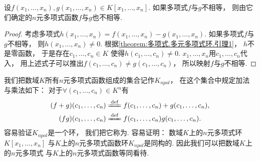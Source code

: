 \begin{theorem}
设\(f(x_1,\dotsc,x_n),g(x_1,\dotsc,x_n) \in K[x_1,\dotsc,x_n]\).
如果多项式\(f\)与\(g\)不相等，
则由它们确定的\(n\)元多项式函数\(f\)与\(g\)也不相等.
\begin{proof}
考虑多项式\(
	h(x_1,\dotsc,x_n)
	=f(x_1,\dotsc,x_n)
	-g(x_1,\dotsc,x_n)
\).
如果多项式\(f\)与\(g\)不相等，
则\(h(x_1,\dotsc,x_n)\neq0\).
根据\cref{theorem:多项式.多元多项式环.引理1}，
\(h\)不是零函数，
于是存在\(c_1,\dotsc,c_n \in K\)
使得\(h(c_1,\dotsc,c_n)\neq0\).
\(x_1,\dotsc,x_n\)用\(c_1,\dotsc,c_n\)代入，
用上述式子可以推出\(f(c_1,\dotsc,c_n) \neq g(c_1,\dotsc,c_n)\)，
所以映射\(f\)与\(g\)不相等.
\end{proof}
\end{theorem}

我们把数域\(K\)所有\(n\)元多项式函数组成的集合记作\(K_{npol}\)，
在这个集合中规定加法与乘法如下：
对于\(\forall(c_1,\dotsc,c_n) \in K^n\)有\begin{gather*}
	(f+g)(c_1,\dotsc,c_n)
	\defeq
	f(c_1,\dotsc,c_n)+g(c_1,\dotsc,c_n), \\
	(fg)(c_1,\dotsc,c_n)
	\defeq
	f(c_1,\dotsc,c_n) g(c_1,\dotsc,c_n).
\end{gather*}
容易验证\(K_{npol}\)是一个环，
我们把它称为.
容易证明：
数域\(K\)上的\(n\)元多项式环\(K[x_1,\dotsc,x_n]\)
与\(K\)上的\(n\)元多项式函数环\(K_{npol}\)是同构的.
因此我们可以把数域\(K\)上的\(n\)元多项式
与\(K\)上的\(n\)元多项式函数等同看待.
